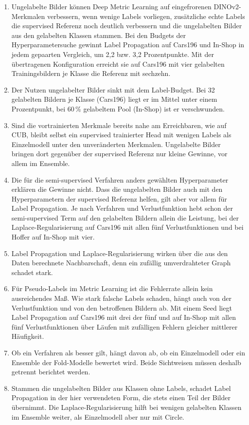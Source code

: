 \begin{enumerate}
  \item Ungelabelte Bilder können Deep Metric Learning auf eingefrorenen DINOv2-Merkmalen verbessern, wenn wenige Labels vorliegen, zusätzliche echte Labels die supervised Referenz noch deutlich verbessern und die ungelabelten Bilder aus den gelabelten Klassen stammen. Bei den Budgets der Hyperparametersuche gewinnt Label Propagation auf Cars196 und In-Shop in jedem gepaarten Vergleich, um 2,2 bzw. 3,2 Prozentpunkte. Mit der übertragenen Konfiguration erreicht sie auf Cars196 mit vier gelabelten Trainingsbildern je Klasse die Referenz mit sechzehn.
  \item Der Nutzen ungelabelter Bilder sinkt mit dem Label-Budget. Bei 32 gelabelten Bildern je Klasse (Cars196) liegt er im Mittel unter einem Prozentpunkt, bei 60\,\% gelabeltem Pool (In-Shop) ist er verschwunden.
  \item Sind die vortrainierten Merkmale bereits nahe am Erreichbaren, wie auf \ac{CUB}, bleibt selbst ein supervised trainierter Head mit wenigen Labels als Einzelmodell unter den unveränderten Merkmalen. Ungelabelte Bilder bringen dort gegenüber der supervised Referenz nur kleine Gewinne, vor allem im Ensemble.
  \item Die für die semi-supervised Verfahren anders gewählten Hyperparameter erklären die Gewinne nicht. Dass die ungelabelten Bilder auch mit den Hyperparametern der supervised Referenz helfen, gilt aber vor allem für Label Propagation. Je nach Verfahren und Verlustfunktion hebt schon der semi-supervised Term auf den gelabelten Bildern allein die Leistung, bei der Laplace-Regularisierung auf Cars196 mit allen fünf Verlustfunktionen und bei Hoffer auf In-Shop mit vier.
  \item Label Propagation und Laplace-Regularisierung wirken über die aus den Daten berechnete Nachbarschaft, denn ein zufällig umverdrahteter Graph schadet stark.
  \item Für Pseudo-Labels im Metric Learning ist die Fehlerrate allein kein ausreichendes Maß. Wie stark falsche Labels schaden, hängt auch von der Verlustfunktion und von den betroffenen Bildern ab. Mit einem Seed liegt Label Propagation auf Cars196 mit drei der fünf und auf In-Shop mit allen fünf Verlustfunktionen über Läufen mit zufälligen Fehlern gleicher mittlerer Häufigkeit.
  \item Ob ein Verfahren als besser gilt, hängt davon ab, ob ein Einzelmodell oder ein Ensemble der Fold-Modelle bewertet wird. Beide Sichtweisen müssen deshalb getrennt berichtet werden.
  \item Stammen die ungelabelten Bilder aus Klassen ohne Labels, schadet Label Propagation in der hier verwendeten Form, die stets einen Teil der Bilder übernimmt. Die Laplace-Regularisierung hilft bei wenigen gelabelten Klassen im Ensemble weiter, als Einzelmodell aber nur mit Circle.
\end{enumerate}
